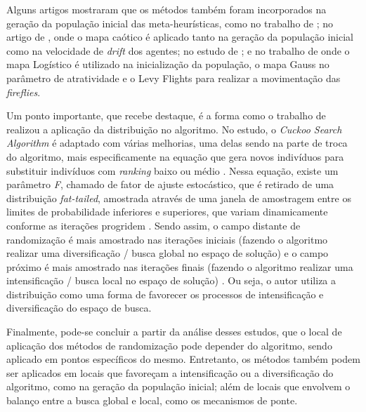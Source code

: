 Alguns artigos mostraram que os métodos também foram incorporados na geração da população inicial das meta-heurísticas, como no trabalho de \cite{saida}; no artigo de \cite{suresh}, onde o mapa caótico é aplicado tanto na geração da população inicial como na velocidade de \textit{drift} dos agentes; no estudo de \cite{abro}; e no trabalho de \cite{chou3} onde o mapa Logístico é utilizado na inicialização da população, o mapa Gauss no parâmetro de atratividade e o Levy Flights para realizar a movimentação das \textit{fireflies}.

Um ponto importante, que recebe destaque, é a forma como o trabalho de \cite{wood} realizou a aplicação da distribuição no algoritmo. No estudo, o \textit{Cuckoo Search Algorithm} é adaptado com várias melhorias, uma delas sendo na parte de troca do algoritmo, mais especificamente na equação que gera novos indivíduos para substituir indivíduos com \textit{ranking} baixo ou médio \cite{wood}. Nessa equação, existe um parâmetro \textit{F}, chamado de fator de ajuste estocástico, que é retirado de uma distribuição \textit{fat-tailed}, amostrada através de uma janela de amostragem entre os limites de probabilidade inferiores e superiores, que variam dinamicamente conforme as iterações progridem \cite{wood}.
Sendo assim, o campo distante de randomização é mais amostrado nas iterações iniciais (fazendo o algoritmo realizar uma diversificação / busca global no espaço de solução) e o campo próximo é mais amostrado nas iterações finais (fazendo o algoritmo realizar uma intensificação / busca local no espaço de solução) \cite{wood}. Ou seja, o autor utiliza a distribuição como uma forma de favorecer os processos de intensificação e diversificação do espaço de busca.

Finalmente, pode-se concluir a partir da análise desses estudos, que o local de aplicação dos métodos de randomização pode depender do algoritmo, sendo aplicado em pontos específicos do mesmo. Entretanto, os métodos também podem ser aplicados em locais que favoreçam a intensificação ou a diversificação do algoritmo, como na geração da população inicial; além de locais que envolvem o balanço entre a busca global e local, como os mecanismos de ponte.



